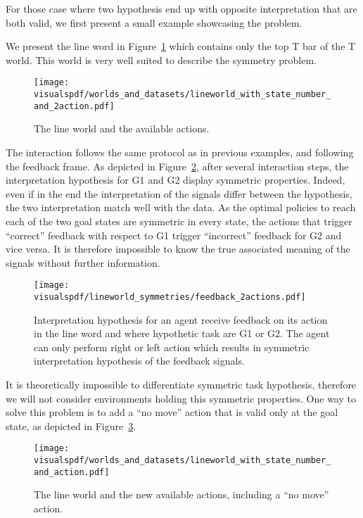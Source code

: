 For those case where two hypothesis end up with opposite interpretation that are both valid, we first present a small example showcasing the problem.

We present the line word in Figure~\ref{fig:lineworld} which contains only the top T bar of the T world. This world is very well suited to describe the symmetry problem. 

\begin{figure}[!ht]
  \centering
  \texttt{[image: \\visualspdf/worlds\_and\_datasets/lineworld\_with\_state\_number\_and\_2action.pdf]}
  \caption{The line world and the available actions.}
  \label{fig:lineworld}
\end{figure}

The interaction follows the same protocol as in previous examples, and following the feedback frame. As depicted in Figure~\ref{fig:lineworldfeedback2action}, after several interaction steps, the interpretation hypothesis for G1 and G2 display symmetric properties. Indeed, even if in the end the interpretation of the signals differ between the hypothesis, the two interpretation match well with the data. As the optimal policies to reach each of the two goal states are symmetric in every state, the actions that trigger ``correct'' feedback with respect to G1 trigger ``incorrect'' feedback for G2 and vice versa. It is therefore impossible to know the true associated meaning of the signals without further information.

\begin{figure}[!ht]
  \centering
  \texttt{[image: \\visualspdf/lineworld\_symmetries/feedback\_2actions.pdf]}
  \caption{Interpretation hypothesis for an agent receive feedback on its action in the line word and where hypothetic task are G1 or G2. The agent can only perform right or left action which results in symmetric interpretation hypothesis of the feedback signals.}
  \label{fig:lineworldfeedback2action}
\end{figure}

It is theoretically impossible to differentiate symmetric task hypothesis, therefore we will not consider environments holding this symmetric properties. One way to solve this problem is to add a ``no move'' action that is valid only at the goal state, as depicted in Figure~\ref{fig:lineworld3action}.

\begin{figure}[!ht]
  \centering
  \texttt{[image: \\visualspdf/worlds\_and\_datasets/lineworld\_with\_state\_number\_and\_action.pdf]}
  \caption{The line world and the new available actions, including a ``no move'' action.}
  \label{fig:lineworld3action}
\end{figure}

